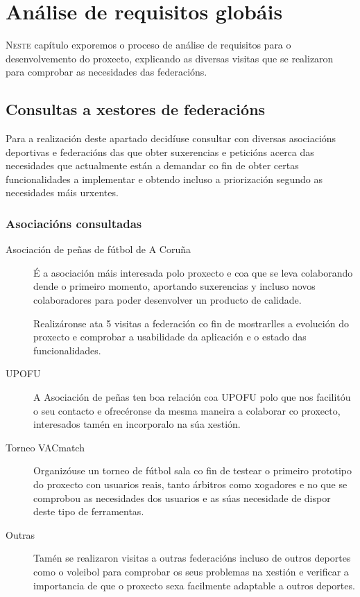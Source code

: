 \chapter{Análise de requisitos globáis}
\minitoc
\label{chap:Analisederequisitosglobais}
\vspace{0.5cm}


  \lettrine{N}{este} capítulo exporemos o proceso de análise de requisitos 
para o desenvolvemento do proxecto, explicando as diversas visitas que se 
realizaron para comprobar as necesidades das federacións.

  \section{Consultas a xestores de federacións}
  Para a realización deste apartado decidíuse consultar con diversas asociacións 
deportivas e federacións das que obter suxerencias e peticións acerca das 
necesidades que actualmente están a demandar co fin de obter certas 
funcionalidades a implementar e obtendo incluso a priorización segundo as 
necesidades máis urxentes.

  \subsection{Asociacións consultadas}

  \begin{description}

  \item [Asociación de peñas de fútbol de A Coruña]
  É a asociación máis interesada polo proxecto e coa que se leva colaborando 
dende o primeiro momento, aportando suxerencias y incluso novos colaboradores 
para poder desenvolver un producto de calidade.

  Realizáronse ata 5 visitas a federación co fin de mostrarlles a evolución do 
proxecto e comprobar a usabilidade da aplicación e o estado das funcionalidades.

  \item [UPOFU]
  A Asociación de peñas ten boa relación coa UPOFU polo que nos facilitóu o seu 
contacto e ofrecéronse da mesma maneira a colaborar co proxecto, interesados 
tamén en incorporalo na súa xestión.

  \item [Torneo VACmatch]
  Organizóuse un torneo de fútbol sala co fin de testear o primeiro prototipo 
do proxecto con usuarios reais, tanto árbitros como xogadores e no que se 
comprobou as necesidades dos usuarios e as súas necesidade de dispor deste tipo 
de ferramentas.

  \item [Outras]
  Tamén se realizaron visitas a outras federacións incluso de outros deportes 
como o voleibol para comprobar os seus problemas na xestión e verificar a 
importancia de que o proxecto sexa facilmente adaptable a outros deportes.
  
  \end{description}

